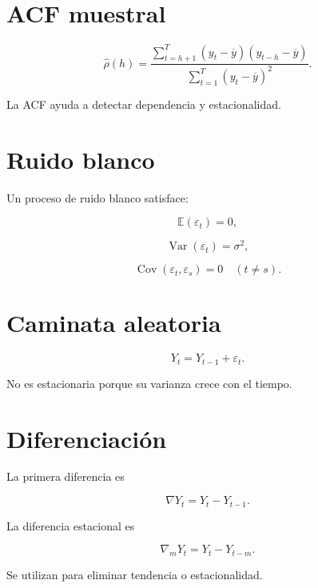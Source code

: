 \documentclass[
  spanish,
  10.5pt,
  letterpaper,
  DIV=11,
  numbers=noendperiod,
  oneside,
  open=any]{scrreprt}
\theoremstyle{definition}
\theoremstyle{definition}
\theoremstyle{plain}
\theoremstyle{remark}
\begin{document}
\section*{ACF muestral}\label{acf-muestral}


\[
\widehat{\rho}(h)
=
\frac{
\sum_{t=h+1}^{T}
(y_t-\overline{y})(y_{t-h}-\overline{y})
}{
\sum_{t=1}^{T}(y_t-\overline{y})^2
}.
\]

La ACF ayuda a detectar dependencia y estacionalidad.

\section*{Ruido blanco}\label{ruido-blanco}


Un proceso de ruido blanco satisface:

\[
\mathbb{E}(\varepsilon_t)=0,
\]

\[
\operatorname{Var}(\varepsilon_t)=\sigma^2,
\]

\[
\operatorname{Cov}(\varepsilon_t,\varepsilon_s)=0
\quad (t\neq s).
\]

\section*{Caminata aleatoria}\label{caminata-aleatoria}


\[
Y_t=Y_{t-1}+\varepsilon_t.
\]

No es estacionaria porque su varianza crece con el tiempo.

\section*{Diferenciación}\label{diferenciaciuxf3n}


La primera diferencia es

\[
\nabla Y_t
=
Y_t-Y_{t-1}.
\]

La diferencia estacional es

\[
\nabla_mY_t
=
Y_t-Y_{t-m}.
\]

Se utilizan para eliminar tendencia o estacionalidad.
\end{document}
